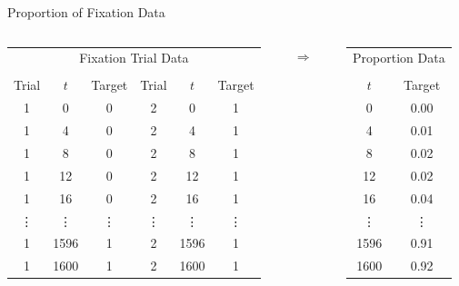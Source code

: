 \documentclass{beamer}
\begin{document}
\begin{frame}{Proportion of Fixation Data}

\begin{columns}
\begin{column}{0.6\textwidth}
\begin{table}[ht]
\centering
\begin{tabular}{cccccc}
\multicolumn{6}{c}{Fixation Trial Data} \\ 
& \\
  \hline
Trial & $t$ & Target & Trial & $t$ & Target \\ 
  \hline
  1 &   0 &   0 &   2 &   0 &   1 \\ 
    1 &   4 &   0 &   2 &   4 &   1 \\ 
    1 &   8 &   0 &   2 &   8 &   1 \\ 
    1 &  12 &   0 &   2 &  12 &   1 \\ 
    1 &  16 &   0 &   2 &  16 &   1 \\ 
    \vdots &  \vdots &   \vdots &   \vdots &  \vdots &   \vdots \\ 
    1 & 1596 &   1 &   2 & 1596 &   1 \\ 
    1 & 1600 &   1 &   2 & 1600 &   1 \\ 
   \hline
\end{tabular}
\end{table}
\end{column}

\begin{column}{0.1\textwidth}  %
\centering
{\huge $\Rightarrow$}
\end{column}

\begin{column}{0.3\textwidth}  %
\vspace{5mm}
\begin{table}[ht]
\centering
\begin{tabular}{cc}
\multicolumn{2}{c}{Proportion Data} \\ 
& \\
  \hline
$t$ & Target \\ 
  \hline
  0 & 0.00 \\ 
    4 & 0.01 \\ 
    8 & 0.02 \\ 
   12 & 0.02 \\ 
   16 & 0.04 \\ 
   \vdots & \vdots \\ 
  1596 & 0.91 \\ 
  1600 & 0.92 \\ 
   \hline
\end{tabular}
\end{table}
\end{column}
\end{columns}



\end{frame}
\end{document}
